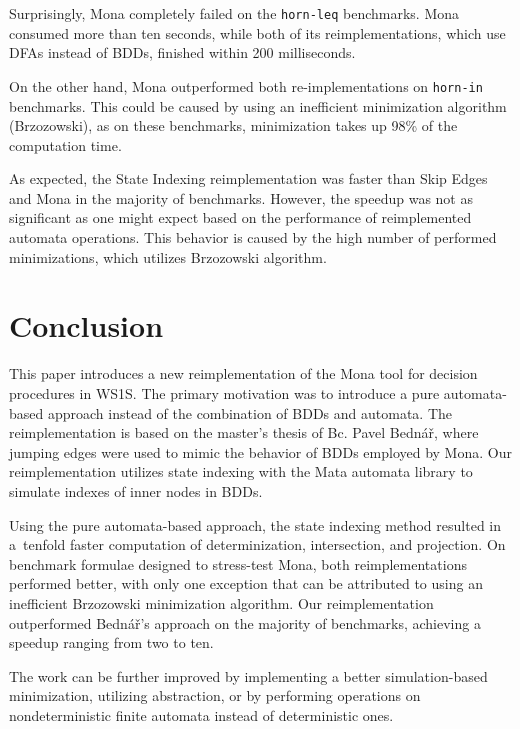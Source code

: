 \documentclass[pdflatex,sn-mathphys-num]{sn-jnl}%
\theoremstyle{thmstyleone}%
\theoremstyle{thmstyletwo}%
\theoremstyle{thmstylethree}%
\begin{document}
        Surprisingly, Mona completely failed on the \texttt{horn-leq} benchmarks. Mona consumed more than ten seconds, while both of its reimplementations, which use DFAs instead of BDDs, finished within 200 milliseconds.

        On the other hand, Mona outperformed both re-implementations on \texttt{horn-in} benchmarks. This could be caused by using an inefficient minimization algorithm (Brzozowski), as on these benchmarks, minimization takes up 98\% of the computation time.

        As expected, the State Indexing reimplementation was faster than Skip Edges and Mona in the majority of benchmarks. However, the speedup was not as significant as one might expect based on the performance of reimplemented automata operations. This behavior is caused by the high number of performed minimizations, which utilizes Brzozowski algorithm.

\section{Conclusion}
    This paper introduces a new reimplementation of the Mona tool for decision procedures in WS1S. The primary motivation was to introduce a pure automata-based approach instead of the combination of BDDs and automata. The reimplementation is based on the master's thesis of Bc. Pavel Bednář, where jumping edges were used to mimic the behavior of BDDs employed by Mona. Our reimplementation utilizes state indexing with the Mata automata library to simulate indexes of inner nodes in BDDs.

    Using the pure automata-based approach, the state indexing method resulted in a~tenfold faster computation of determinization, intersection, and projection. On benchmark formulae designed to stress-test Mona, both reimplementations performed better, with only one exception that can be attributed to using an inefficient Brzozowski minimization algorithm. Our reimplementation outperformed Bednář's approach on the majority of benchmarks, achieving a speedup ranging from two to ten.

    The work can be further improved by implementing a better simulation-based minimization, utilizing abstraction, or by performing operations on nondeterministic finite automata instead of deterministic ones.

    \vspace*{5em}

\end{document}
